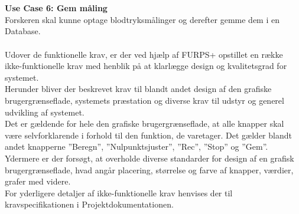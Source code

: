 \\\\
\textbf{Use Case 6: Gem måling}\\
Forskeren skal kunne optage blodtryksmålinger og derefter gemme dem i en Database. 
\\\\
Udover de funktionelle krav, er der ved hjælp af FURPS+ opstillet en række ikke-funktionelle krav med henblik på at klarlægge design og kvalitetsgrad for systemet. \\
Herunder bliver der beskrevet krav til blandt andet design af den grafiske brugergrænseflade, systemets præstation og diverse krav til udstyr og generel udvikling af systemet.\\
Det er gældende for hele den grafiske brugergrænseflade, at alle knapper skal være selvforklarende i forhold til den funktion, de varetager. Det gælder blandt andet knapperne ”Beregn”, ”Nulpunktsjuster”, ”Rec”, ”Stop” og ”Gem”.\\
Ydermere er der forsøgt, at overholde diverse standarder for design af en grafisk brugergrænseflade, hvad angår placering, størrelse og farve af knapper, værdier, grafer med videre.\\
For yderligere detaljer af ikke-funktionelle krav henvises der til kravspecifikationen i Projektdokumentationen.



 



